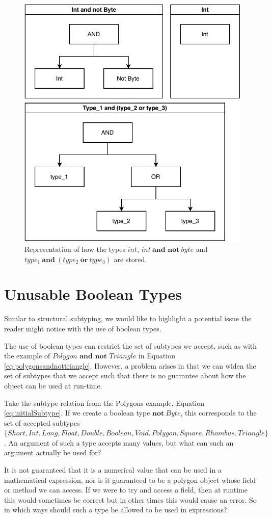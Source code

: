 \documentclass{l4proj}
\begin{document}
\begin{figure}
    \label{fig:boolfig}
    \centering
    \includegraphics[width=0.7\linewidth]{images/diag.pdf}
    \caption{Representation of how the types $int$, $int \ \textbf{and not}\ byte$ and $type_{1}\ \textbf{and}\ (type_{2}\ \textbf{or}\ type_{3})$ are stored.}
\end{figure}

\section{Unusable Boolean Types}
\label{unusable}

Similar to structural subtyping, we would like to highlight a potential issue the reader might notice with the use of boolean types.

The use of boolean types can restrict the set of subtypes we accept, such as with the example of $Polygon \textbf{ and not } Triangle$ in Equation \ref{eq:polygonsandnottriangle}.
However, a problem arises in that we can widen the set of subtypes that we accept such that there is no guarantee about how the object can be used at run-time.

Take the subtype relation from the Polygons example, Equation \ref{eq:initialSubtype}.
If we create a boolean type $\textbf{not}\ Byte$, this corresponds to the set of accepted subtypes $\{Short, Int, Long, Float, Double, Boolean, \allowbreak Void, Polygon, Square, Rhombus, Triangle\}$.
An argument of such a type accepts many values, but what can such an argument actually be used for?

It is not guaranteed that it is a numerical value that can be used in a mathematical expression, nor is it guaranteed to be a polygon object whose field or method we can access.
If we were to try and access a field, then at runtime this would sometimes be correct but in other times this would cause an error.
So in which ways should such a type be allowed to be used in expressions?
\end{document}
